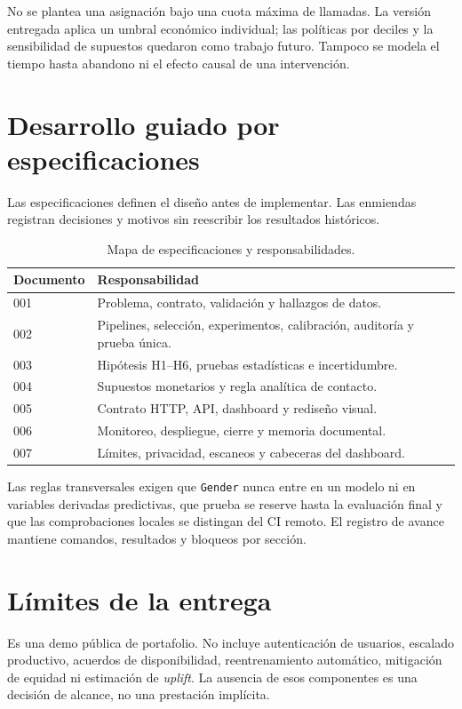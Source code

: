 \documentclass[11pt,a4paper,oneside]{report}
\begin{document}
No se plantea una asignación bajo una cuota máxima de llamadas. La versión
entregada aplica un umbral económico individual; las políticas por deciles y
la sensibilidad de supuestos quedaron como trabajo futuro. Tampoco se modela
el tiempo hasta abandono ni el efecto causal de una intervención.

\section{Desarrollo guiado por especificaciones}
Las especificaciones definen el diseño antes de implementar. Las enmiendas
registran decisiones y motivos sin reescribir los resultados históricos.
\begin{table}[htbp]\centering\small
\caption{Mapa de especificaciones y responsabilidades.}
\begin{tabularx}{\textwidth}{@{}lX@{}}\toprule
Documento & Responsabilidad \\\midrule
001 & Problema, contrato, validación y hallazgos de datos. \\
002 & Pipelines, selección, experimentos, calibración, auditoría y prueba única. \\
003 & Hipótesis H1--H6, pruebas estadísticas e incertidumbre. \\
004 & Supuestos monetarios y regla analítica de contacto. \\
005 & Contrato HTTP, API, dashboard y rediseño visual. \\
006 & Monitoreo, despliegue, cierre y memoria documental. \\
007 & Límites, privacidad, escaneos y cabeceras del dashboard. \\\bottomrule
\end{tabularx}
\end{table}

Las reglas transversales exigen que \texttt{Gender} nunca entre en un modelo ni
en variables derivadas predictivas, que prueba se reserve hasta la evaluación
final y que las comprobaciones locales se distingan del CI remoto. El registro
de avance mantiene comandos, resultados y bloqueos por sección.

\section{Límites de la entrega}
Es una demo pública de portafolio. No incluye autenticación de usuarios,
escalado productivo, acuerdos de disponibilidad, reentrenamiento automático,
mitigación de equidad ni estimación de \textit{uplift}. La ausencia de esos
componentes es una decisión de alcance, no una prestación implícita.
\end{document}
